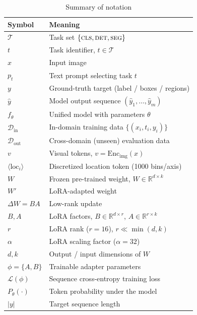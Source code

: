\documentclass[conference]{IEEEtran}
\begin{document}
\begin{table}[htbp]
\caption{Summary of notation}
\label{tab:notation}
\begin{center}
\setlength{\tabcolsep}{4pt}
\footnotesize
\begin{tabular}{@{}ll@{}}
\toprule
\textbf{Symbol} & \textbf{Meaning} \\
\midrule
$\mathcal{T}$ & Task set $\{\textsc{cls},\textsc{det},\textsc{seg}\}$ \\
$t$ & Task identifier, $t\in\mathcal{T}$ \\
$x$ & Input image \\
$p_t$ & Text prompt selecting task $t$ \\
$y$ & Ground-truth target (label / boxes / regions) \\
$\hat{y}$ & Model output sequence $(\hat{y}_1,\ldots,\hat{y}_m)$ \\
$f_\theta$ & Unified model with parameters $\theta$ \\
$\mathcal{D}_{\text{in}}$ & In-domain training data $\{(x_i,t_i,y_i)\}$ \\
$\mathcal{D}_{\text{out}}$ & Cross-domain (unseen) evaluation data \\
$v$ & Visual tokens, $v=\mathrm{Enc}_{\text{img}}(x)$ \\
$\langle\text{loc}_i\rangle$ & Discretized location token (1000 bins/axis) \\
\midrule
$W$ & Frozen pre-trained weight, $W\in\mathbb{R}^{d\times k}$ \\
$W'$ & LoRA-adapted weight \\
$\Delta W{=}BA$ & Low-rank update \\
$B,A$ & LoRA factors, $B\in\mathbb{R}^{d\times r}$, $A\in\mathbb{R}^{r\times k}$ \\
$r$ & LoRA rank ($r{=}16$), $r\ll\min(d,k)$ \\
$\alpha$ & LoRA scaling factor ($\alpha{=}32$) \\
$d,k$ & Output / input dimensions of $W$ \\
$\phi{=}\{A,B\}$ & Trainable adapter parameters \\
$\mathcal{L}(\phi)$ & Sequence cross-entropy training loss \\
$P_\theta(\cdot)$ & Token probability under the model \\
$|y|$ & Target sequence length \\
\bottomrule
\end{tabular}
\end{center}
\end{table}
\end{document}

